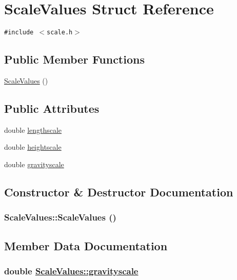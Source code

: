 \hypertarget{structScaleValues}{
\section{Scale\-Values Struct Reference}
\label{structScaleValues}
}
{\tt \#include $<$scale.h$>$}

\subsection*{Public Member Functions}
\begin{CompactItemize}
\item 
\hyperlink{structScaleValues_a0}{Scale\-Values} ()
\end{CompactItemize}
\subsection*{Public Attributes}
\begin{CompactItemize}
\item 
double \hyperlink{structScaleValues_o0}{lengthscale}
\item 
double \hyperlink{structScaleValues_o1}{heightscale}
\item 
double \hyperlink{structScaleValues_o2}{gravityscale}
\end{CompactItemize}


\subsection{Constructor \& Destructor Documentation}
\hypertarget{structScaleValues_a0}{
\subsubsection[ScaleValues]{\setlength{\rightskip}{0pt plus 5cm}Scale\-Values::Scale\-Values ()}}
\label{structScaleValues_a0}




\subsection{Member Data Documentation}
\hypertarget{structScaleValues_o2}{
\subsubsection[gravityscale]{\setlength{\rightskip}{0pt plus 5cm}double \hyperlink{structScaleValues_o2}{Scale\-Values::gravityscale}}}
\label{structScaleValues_o2}


